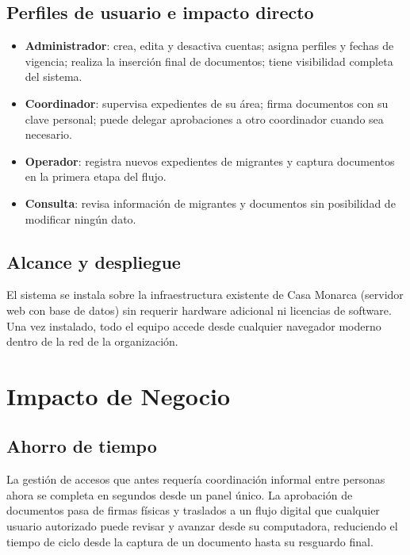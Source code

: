 \documentclass[10pt,letterpaper]{report}
\begin{document}
\section{Perfiles de usuario e impacto directo}

\begin{itemize}[noitemsep]
  \item \textbf{Administrador}: crea, edita y desactiva cuentas; asigna perfiles y fechas de vigencia; realiza la inserción final de documentos; tiene visibilidad completa del sistema.
  \item \textbf{Coordinador}: supervisa expedientes de su área; firma documentos con su clave personal; puede delegar aprobaciones a otro coordinador cuando sea necesario.
  \item \textbf{Operador}: registra nuevos expedientes de migrantes y captura documentos en la primera etapa del flujo.
  \item \textbf{Consulta}: revisa información de migrantes y documentos sin posibilidad de modificar ningún dato.
\end{itemize}

\section{Alcance y despliegue}

El sistema se instala sobre la infraestructura existente de Casa Monarca (servidor web con base de datos) sin requerir hardware adicional ni licencias de software. Una vez instalado, todo el equipo accede desde cualquier navegador moderno dentro de la red de la organización.

\chapter{Impacto de Negocio}

\section{Ahorro de tiempo}

La gestión de accesos que antes requería coordinación informal entre personas ahora se completa en segundos desde un panel único. La aprobación de documentos pasa de firmas físicas y traslados a un flujo digital que cualquier usuario autorizado puede revisar y avanzar desde su computadora, reduciendo el tiempo de ciclo desde la captura de un documento hasta su resguardo final.
\end{document}

